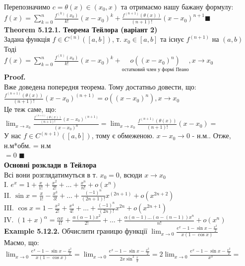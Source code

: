 \documentclass[a4paper, 14pt]{extarticle}
\def\huge{\displaystyle}
\def\bigline{\vspace{5mm}\\}
\def\ex#1{\textbf{Example {#1}}}
\def\th#1{\textbf{Theorem {#1}}}
\def\proof{\textbf{Proof.}\\}
\def\bigline{\vspace{5mm}\\}
\def\qed{$\blacksquare$}
\begin{document}
Перепозначимо $c = \theta(x) \in (x_0,x)$ та отримаємо нашу бажану формулу:\\
$f(x) = \huge \sum_{k=0}^n \frac{f^{(k)}(x_0)}{k!}(x-x_0)^k + \frac{f^{(n+1)}(\theta(x))}{(n+1)!}(x-x_0)^{n+1}$\qed
\bigline
\th{5.12.1. Теорема Тейлора (варіант 2)}\\
Задана функція $f \in C^{(n)}([a,b])$, т. $x_0 \in [a,b]$ та існує $f^{(n+1)}$ на $(a,b)$\\
Тоді\\
$f(x) = \huge \sum_{k=0}^n \frac{f^{(k)}(x_0)}{k!}(x-x_0)^k + \underset{\textrm{остатковий член у формі Пеано}}{o((x-x_0)^n)}, x \to x_0$\\
\proof
Вже доведена попередня теорема. Тому достатньо довести, що:\\
$\huge \frac{f^{(n+1)}(\theta(x))}{(n+1)!}(x-x_0)^{(n+1)} = o((x-x_0)^n), x \to x_0$\\
Це теж саме, що:\\
$\huge \lim_{x \to x_0} \frac{\displaystyle \frac{f^{(n+1)}(\theta(x))}{(n+1)!}(x-x_0)^{(n+1)}}{(x-x_0)^n} = \lim_{x \to x_0} \frac{f^{(n+1)}(\theta(x))}{(n+1)!}(x-x_0)=$\\
У нас $f \in C^{(n+1)}([a,b])$, тому є обмеженою. $x-x_0 \to 0$ - н.м.. Отже, н.м*обм. = н.м\\
$= 0$ \qed
\bigline
\textbf{Основні розклади в Тейлора}\\
Всі вони розглядатимуться в т. $x_0 = 0$, всюди $x \to x_0$\\
I. $e^x \huge = 1 + \frac{x}{1!} + \frac{x^2}{2!} + \dots + \frac{x^n}{n!} + o(x^n)$\\
II. $\sin x \huge = \frac{x}{1!} - \frac{x^3}{3!} + \dots + \frac{(-1)^n}{(2n+1)!}x^{(2n+1)} + o(x^{2n+2})$\\
III. $\cos x \huge = 1 - \frac{x^2}{2!} + \frac{x^4}{4!} + \dots + \frac{(-1)^n}{(2n)!}x^{2n} + o(x^{2n+1})$\\
IV. $(1+x)^{\alpha} \huge = \frac{\alpha x}{1!} + \frac{\alpha (\alpha-1) x^2}{2!} + \dots + \frac{\alpha (\alpha-1)\dots(\alpha-(n-1)) x^n}{n!} + o(x^n)$
\bigline
\ex{5.12.2.} Обчислити границю функції $\huge \lim_{x \to 0} \frac{\huge e^x-1-\sin x - \frac{x^2}{2}}{x(1-\cos x)}$\\
Маємо, що:\\
$\huge \lim_{x \to 0} \frac{\huge e^x-1-\sin x - \frac{x^2}{2}}{x(1-\cos x)} = \lim_{x \to 0} \frac{\huge e^x - 1 - \sin x - \frac{x^2}{2}}{2x \sin^2 \frac{x}{2}} = 2\lim_{x \to 0} \frac{\huge e^x - 1 - \sin x - \frac{x^2}{2}}{x^3} = $\\
\end{document}
